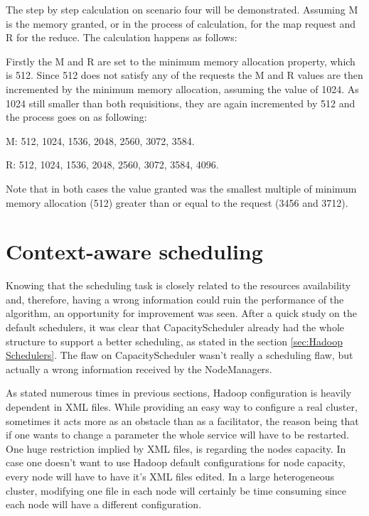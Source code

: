 The step by step calculation on scenario four will be demonstrated. Assuming M is the memory granted, or in the process of calculation, for the map request and R for the reduce. The calculation happens as follows:

Firstly the M and R are set to the minimum memory allocation property, which is 512. Since 512 does not satisfy any of the requests the M and R values are then incremented by the minimum memory allocation, assuming the value of 1024. As 1024 still smaller than both requisitions, they are again incremented by 512 and the process goes on as following:

M: 512, 1024, 1536, 2048, 2560, 3072, 3584.

R: 512, 1024, 1536, 2048, 2560, 3072, 3584, 4096.

Note that in both cases the value granted was the smallest multiple of minimum memory allocation (512) greater than or equal to the request (3456 and 3712).


\section{Context-aware scheduling}
Knowing that the scheduling task is closely related to the resources availability and, therefore, having a wrong information could ruin the performance of the algorithm, an opportunity for improvement was seen. After a quick study on the default schedulers, it was clear that CapacityScheduler already had the whole structure to support a better scheduling, as stated in the section \ref{sec:Hadoop Schedulers}. The flaw on CapacityScheduler wasn't really a scheduling flaw, but actually a wrong information received by the NodeManagers.

As stated numerous times in previous sections, Hadoop configuration is heavily dependent in XML files. While providing an easy way to configure a real cluster, sometimes it acts more as an obstacle than as a facilitator, the reason being that if one wants to change a parameter the whole service will have to be restarted. One huge restriction implied by XML files, is regarding the nodes capacity. In case one doesn't want to use Hadoop default configurations for node capacity, every node will have to have it's XML files edited. In a large heterogeneous cluster, modifying one file in each node will certainly be time consuming since each node will have a different configuration. 

